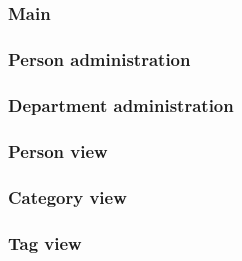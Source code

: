 \subsection{\ainterface}
\label{sec:admininterface}

\subsubsection{Main}


\subsubsection{Person administration}

\subsubsection{Department administration}

\subsubsection{Person view}

\subsubsection{Category view}

\subsubsection{Tag view}

